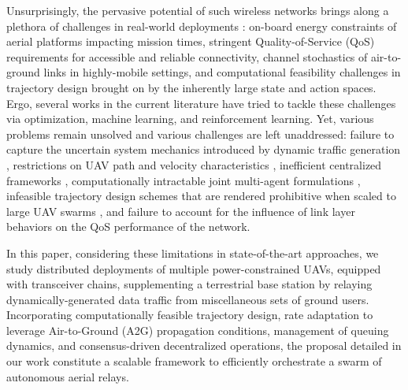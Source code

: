 \documentclass[10pt, twocolumn]{IEEEtran}
\theoremstyle{plain}
\theoremstyle{definition}
\theoremstyle{remark}
\begin{document}
Unsurprisingly, the pervasive potential of such wireless networks brings along a plethora of challenges in real-world deployments \cite{FundamentalTradeoffs}: on-board energy constraints of aerial platforms impacting mission times, stringent Quality-of-Service (QoS) requirements for accessible and reliable connectivity, channel stochastics of air-to-ground links in highly-mobile settings, and computational feasibility challenges in trajectory design brought on by the inherently large state and action spaces. Ergo, several works in the current literature have tried to tackle these challenges via optimization, machine learning, and reinforcement learning. Yet, various problems remain unsolved and various challenges are left unaddressed: failure to capture the uncertain system mechanics introduced by dynamic traffic generation \cite{SCA, PAoI, MEC-CVX, LoSMap, Rician},  restrictions on UAV path and velocity characteristics \cite{PSOPathStructure,PAoI}, inefficient centralized frameworks \cite{CSCA-ADMM, GameTheory, UAVDynamicCoverage}, computationally intractable joint multi-agent formulations \cite{DDQN, MEC-DDPG, DQNPositioning, MLDeployment}, infeasible trajectory design schemes that are rendered prohibitive when scaled to large UAV swarms \cite{SCA, PSO, CSO}, and failure to account for the influence of link layer behaviors on the QoS performance of the network.

In this paper, considering these limitations in state-of-the-art approaches, we study distributed deployments of multiple power-constrained UAVs, equipped with transceiver chains, supplementing a terrestrial base station by relaying dynamically-generated data traffic from miscellaneous sets of ground users. Incorporating computationally feasible trajectory design, rate adaptation to leverage Air-to-Ground (A2G) propagation conditions, management of queuing dynamics, and consensus-driven decentralized operations, the proposal detailed in our work constitute a scalable framework to efficiently orchestrate a swarm of autonomous aerial relays.
\end{document}
